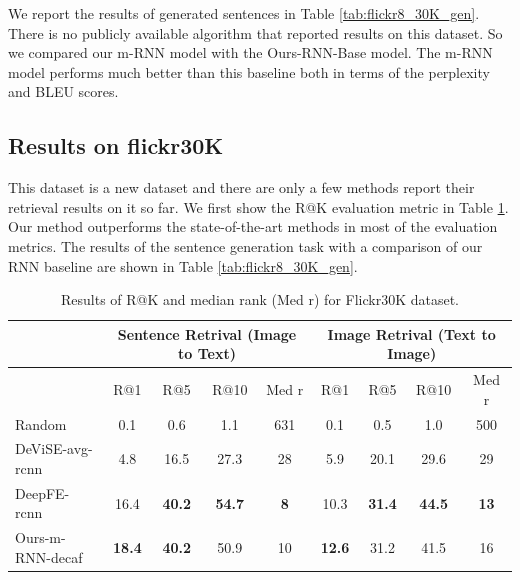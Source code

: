 We report the results of generated sentences in Table \ref{tab:flickr8_30K_gen}.
There is no publicly available algorithm that reported results on this dataset.
So we compared our m-RNN model with the Ours-RNN-Base model.
The m-RNN model performs much better than this baseline both in terms of the perplexity and BLEU scores.


\subsection{Results on flickr30K}

This dataset is a new dataset and there are only a few methods report their retrieval results on it so far.
We first show the R@K evaluation metric in Table \ref{tab:flickr30K_ret}.
Our method outperforms the state-of-the-art methods in most of the evaluation metrics.
The results of the sentence generation task with a comparison of our RNN baseline are shown in Table \ref{tab:flickr8_30K_gen}.

\vspace{-0.5em}
\begin{table}[htb]
	\centering
\begin{tabular}{l|cccc|cccc}
\hline
      & \multicolumn{4}{c|}{Sentence Retrival (Image to Text)} & \multicolumn{4}{c}{Image Retrival (Text to Image)} \\
\hline
      & R@1   & R@5   & R@10  & Med r & R@1   & R@5   & R@10  & Med r \\
Random & 0.1   & 0.6   & 1.1   & 631   & 0.1   & 0.5   & 1.0   & 500 \\
DeViSE-avg-rcnn \cite{frome2013devise} & 4.8   & 16.5  & 27.3  & 28    & 5.9   & 20.1  & 29.6  & 29 \\
DeepFE-rcnn \cite{karpathy2014fragment} & 16.4  & \textbf{40.2} & \textbf{54.7} & \textbf{8} & 10.3  & \textbf{31.4} & \textbf{44.5} & \textbf{13} \\
Ours-m-RNN-decaf & \textbf{18.4} & \textbf{40.2} & 50.9  & 10    & \textbf{12.6} & 31.2  & 41.5  & 16 \\
\hline
\end{tabular}%
\vspace{-0.3em}
	\caption{Results of R@K and median rank (Med r) for Flickr30K dataset.}
	\label{tab:flickr30K_ret}
\end{table}

